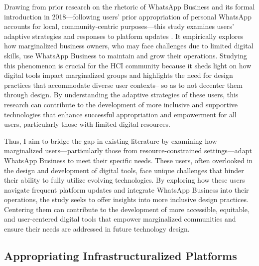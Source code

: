 Drawing from prior research on the rhetoric of WhatsApp Business and its formal introduction in 2018—following users' prior appropriation of personal WhatsApp accounts for local, community-centric purposes—this study examines users' adaptive strategies and responses to platform updates \cite{10.1145/3613905.3651034}. It empirically explores how marginalized business owners, who may face challenges due to limited digital skills, use WhatsApp Business to maintain and grow their operations. Studying this phenomenon is crucial for the HCI community because it sheds light on how digital tools impact marginalized groups and highlights the need for design practices that accommodate diverse user contexts-- so as to not decenter them through design.  By understanding the adaptive strategies of these users, this research can contribute to the development of more inclusive and supportive technologies that enhance successful appropriation and empowerment for all users, particularly those with limited digital resources.

Thus, I aim to bridge the gap in existing literature by examining how marginalized users—particularly those from resource-constrained settings—adapt WhatsApp Business to meet their specific needs. These users, often overlooked in the design and development of digital tools, face unique challenges that hinder their ability to fully utilize evolving technologies. By exploring how these users navigate frequent platform updates and integrate WhatsApp Business into their operations, the study seeks to offer insights into more inclusive design practices. Centering them can contribute to the development of more accessible, equitable, and user-centered digital tools that empower marginalized communities and ensure their needs are addressed in future technology design.













\subsection{Appropriating Infrastructuralized Platforms}



